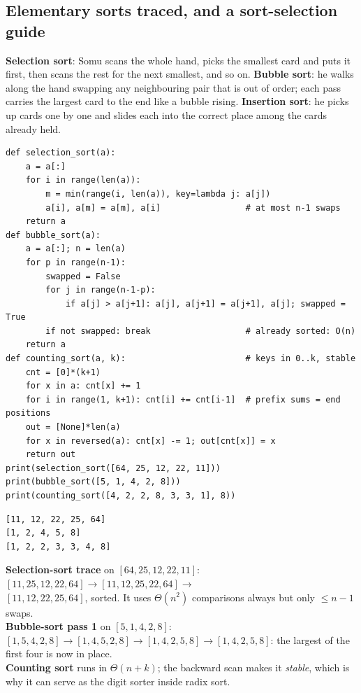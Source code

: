 \documentclass[11pt,a4paper]{article}
\begin{document}
\subsection{Elementary sorts traced, and a sort-selection guide}
\begin{story}
\textbf{Selection sort}: Somu scans the whole hand, picks the smallest card and puts it first, then scans the rest for the next smallest, and so on. \textbf{Bubble sort}: he walks along the hand swapping any neighbouring pair that is out of order; each pass carries the largest card to the end like a bubble rising. \textbf{Insertion sort}: he picks up cards one by one and slides each into the correct place among the cards already held.
\end{story}
\begin{lstlisting}
def selection_sort(a):
    a = a[:]
    for i in range(len(a)):
        m = min(range(i, len(a)), key=lambda j: a[j])
        a[i], a[m] = a[m], a[i]                 # at most n-1 swaps
    return a
def bubble_sort(a):
    a = a[:]; n = len(a)
    for p in range(n-1):
        swapped = False
        for j in range(n-1-p):
            if a[j] > a[j+1]: a[j], a[j+1] = a[j+1], a[j]; swapped = True
        if not swapped: break                   # already sorted: O(n)
    return a
def counting_sort(a, k):                        # keys in 0..k, stable
    cnt = [0]*(k+1)
    for x in a: cnt[x] += 1
    for i in range(1, k+1): cnt[i] += cnt[i-1]  # prefix sums = end positions
    out = [None]*len(a)
    for x in reversed(a): cnt[x] -= 1; out[cnt[x]] = x
    return out
print(selection_sort([64, 25, 12, 22, 11]))
print(bubble_sort([5, 1, 4, 2, 8]))
print(counting_sort([4, 2, 2, 8, 3, 3, 1], 8))
\end{lstlisting}
\begin{lstlisting}[style=out]
[11, 12, 22, 25, 64]
[1, 2, 4, 5, 8]
[1, 2, 2, 3, 3, 4, 8]
\end{lstlisting}
\textbf{Selection-sort trace} on $[64,25,12,22,11]$: $[11,25,12,22,64]\to[11,12,25,22,64]\to$\\ $[11,12,22,25,64]$, sorted. It uses $\Theta(n^2)$ comparisons always but only $\le n-1$ swaps.\\
\textbf{Bubble-sort pass 1} on $[5,1,4,2,8]$: $[1,5,4,2,8]\to[1,4,5,2,8]\to[1,4,2,5,8]\to[1,4,2,5,8]$: the largest of the first four is now in place.\\
\textbf{Counting sort} runs in $\Theta(n+k)$; the backward scan makes it \emph{stable}, which is why it can serve as the digit sorter inside radix sort.
\end{document}
